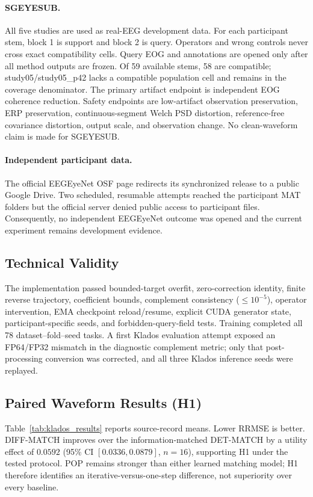 \paragraph{SGEYESUB.}
All five studies are used as real-EEG development data.  For each participant
stem, block 1 is support and block 2 is query.  Operators and wrong controls
never cross exact compatibility cells.  Query EOG and annotations are opened
only after all method outputs are frozen.  Of 59 available stems, 58 are
compatible; study05/study05\_p42 lacks a compatible population cell and remains
in the coverage denominator.  The primary artifact endpoint is independent EOG
coherence reduction.  Safety endpoints are low-artifact observation
preservation, ERP preservation, continuous-segment Welch PSD distortion,
reference-free covariance distortion, output scale, and observation change.
No clean-waveform claim is made for SGEYESUB.

\paragraph{Independent participant data.}
The official EEGEyeNet OSF page redirects its synchronized release to a public
Google Drive.  Two scheduled, resumable attempts reached the participant MAT
folders but the official server denied public access to participant files.
Consequently, no independent EEGEyeNet outcome was opened and the current
experiment remains development evidence.

\subsection{Technical Validity}
The implementation passed bounded-target overfit, zero-correction identity,
finite reverse trajectory, coefficient bounds, complement consistency
($\le10^{-5}$), operator intervention, EMA checkpoint reload/resume, explicit
CUDA generator state, participant-specific seeds, and forbidden-query-field
tests.  Training completed all 78 dataset--fold--seed tasks.  A first Klados
evaluation attempt exposed an FP64/FP32 mismatch in the diagnostic complement
metric; only that post-processing conversion was corrected, and all three
Klados inference seeds were replayed.

\subsection{Paired Waveform Results (H1)}
Table~\ref{tab:klados_results} reports source-record means.  Lower RRMSE is
better.  DIFF-MATCH improves over the information-matched DET-MATCH by a utility
effect of $0.0592$ (95\% CI $[0.0336,0.0879]$, $n=16$), supporting H1 under the
tested protocol.  POP remains stronger than either learned matching model; H1
therefore identifies an iterative-versus-one-step difference, not superiority
over every baseline.

